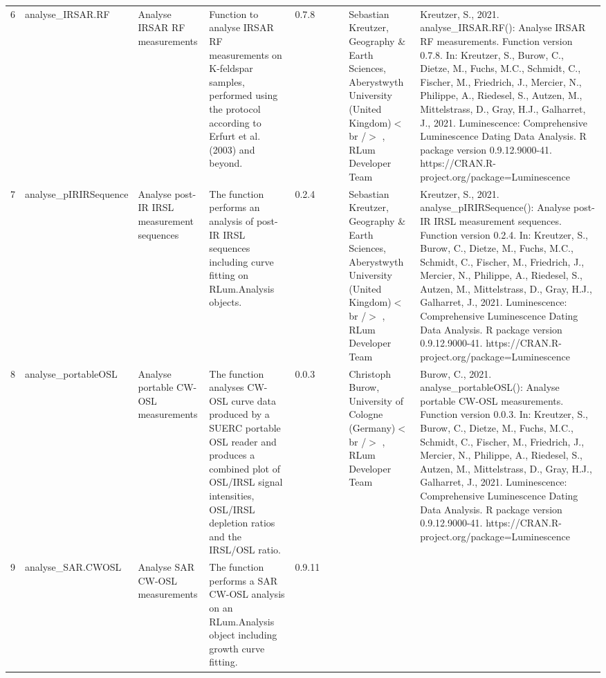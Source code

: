 \begin{table}[ht]
\begin{tabular}{rllllllll}
  6 & analyse\_IRSAR.RF & Analyse IRSAR RF measurements & Function to analyse IRSAR RF measurements on K-feldspar samples, performed using the protocol according to Erfurt et al. (2003) and beyond. & 0.7.8
 &  &  & Sebastian Kreutzer, Geography \& Earth Sciences, Aberystwyth University (United Kingdom)$<$br /$>$ , RLum Developer Team & Kreutzer, S., 2021. analyse\_IRSAR.RF(): Analyse IRSAR RF measurements. Function version 0.7.8. In: Kreutzer, S., Burow, C., Dietze, M., Fuchs, M.C., Schmidt, C., Fischer, M., Friedrich, J., Mercier, N., Philippe, A., Riedesel, S., Autzen, M., Mittelstrass, D., Gray, H.J., Galharret, J., 2021. Luminescence: Comprehensive Luminescence Dating Data Analysis. R package version 0.9.12.9000-41. https://CRAN.R-project.org/package=Luminescence
 \\ 
  7 & analyse\_pIRIRSequence & Analyse post-IR IRSL measurement sequences & The function performs an analysis of post-IR IRSL sequences including curve fitting on  RLum.Analysis  objects. & 0.2.4
 &  &  & Sebastian Kreutzer, Geography \& Earth Sciences, Aberystwyth University (United Kingdom)$<$br /$>$ , RLum Developer Team & Kreutzer, S., 2021. analyse\_pIRIRSequence(): Analyse post-IR IRSL measurement sequences. Function version 0.2.4. In: Kreutzer, S., Burow, C., Dietze, M., Fuchs, M.C., Schmidt, C., Fischer, M., Friedrich, J., Mercier, N., Philippe, A., Riedesel, S., Autzen, M., Mittelstrass, D., Gray, H.J., Galharret, J., 2021. Luminescence: Comprehensive Luminescence Dating Data Analysis. R package version 0.9.12.9000-41. https://CRAN.R-project.org/package=Luminescence
 \\ 
  8 & analyse\_portableOSL & Analyse portable CW-OSL measurements & The function analyses CW-OSL curve data produced by a SUERC portable OSL reader and produces a combined plot of OSL/IRSL signal intensities, OSL/IRSL depletion ratios and the IRSL/OSL ratio. & 0.0.3
 &  &  & Christoph Burow, University of Cologne (Germany)$<$br /$>$ , RLum Developer Team & Burow, C., 2021. analyse\_portableOSL(): Analyse portable CW-OSL measurements. Function version 0.0.3. In: Kreutzer, S., Burow, C., Dietze, M., Fuchs, M.C., Schmidt, C., Fischer, M., Friedrich, J., Mercier, N., Philippe, A., Riedesel, S., Autzen, M., Mittelstrass, D., Gray, H.J., Galharret, J., 2021. Luminescence: Comprehensive Luminescence Dating Data Analysis. R package version 0.9.12.9000-41. https://CRAN.R-project.org/package=Luminescence
 \\ 
  9 & analyse\_SAR.CWOSL & Analyse SAR CW-OSL measurements & The function performs a SAR CW-OSL analysis on an RLum.Analysis  object including growth curve fitting. & 0.9.11

\end{tabular}
\end{table}
